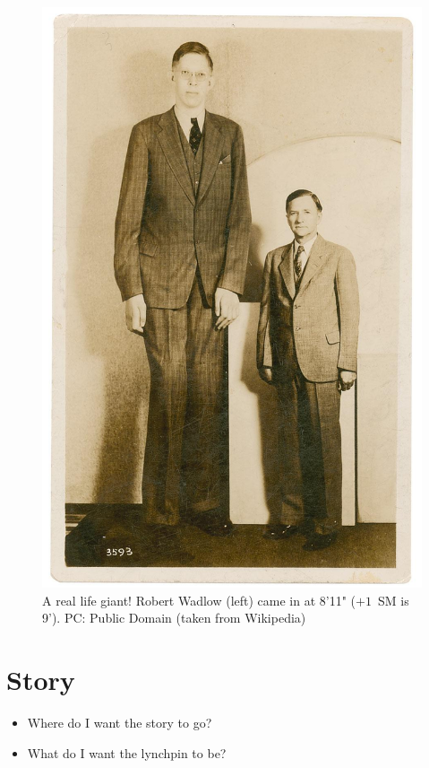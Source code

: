 \documentclass[twocolumn]{memoir}
\begin{document}
\begin{figure}
\centering
\includegraphics[height=0.5\textheight]{Robert_Wadlow_postcard.jpg}
\caption{A real life giant! Robert Wadlow (left) came in at 8'11" (\(+1\)~SM is 9'). PC: Public Domain (taken from Wikipedia)}
\end{figure}

\chapter{Story}
\begin{commentbox}
\begin{itemize}
\item Where do I want the story to go?
\item What do I want the lynchpin to be?
\end{itemize}
\end{commentbox}
\end{document}
